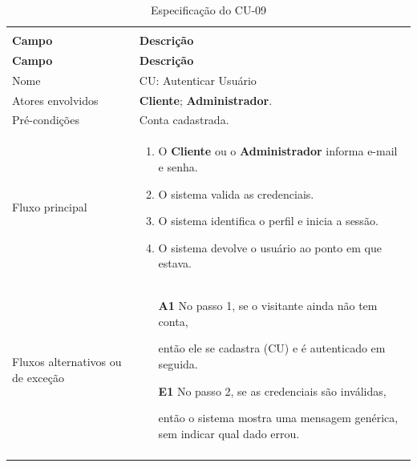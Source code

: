 \documentclass[12pt,a4paper]{article}
\begin{document}
{\setlength{\arrayrulewidth}{0.3pt}\renewcommand{\arraystretch}{1.1}\small{}
\begin{xltabular}{\textwidth}{>{\raggedright\arraybackslash}p{3.4cm}|>{\raggedright\arraybackslash}X}
\caption{Especificação do CU-09}\\
\toprule{}
\textbf{Campo} & \textbf{Descrição}\\ \midrule{}
\endfirsthead
{}\toprule{}
\textbf{Campo} & \textbf{Descrição}\\ \midrule{}
\endhead
\endlastfoot
Nome & CU: Autenticar Usuário\\ \hline
Atores envolvidos & \textbf{Cliente}; \textbf{Administrador}.\\ \hline
Pré-condições & Conta cadastrada.\\ \hline
Fluxo principal & \begin{enumerate}[nosep,leftmargin=1.4em,label=\arabic*.,before=\vspace{-\baselineskip},after=\vspace{-0.4\baselineskip}]\item O \textbf{Cliente} ou o \textbf{Administrador} informa e-mail e senha. \item O sistema valida as credenciais. \item O sistema identifica o perfil e inicia a sessão. \item O sistema devolve o usuário ao ponto em que estava. \end{enumerate}\\ \hline
Fluxos alternativos ou de exceção & \begin{itemize}[nosep,leftmargin=2.2em,labelwidth=2.2em,labelsep=0pt,align=left,itemsep=4pt,before=\vspace{-\baselineskip},after=\vspace{-0.4\baselineskip}]\item[\textbf{A1}] No passo 1, se o visitante ainda não tem conta,\par então ele se cadastra (CU) e é autenticado em seguida. \item[\textbf{E1}] No passo 2, se as credenciais são inválidas,\par então o sistema mostra uma mensagem genérica, sem indicar qual dado errou.\end{itemize}\\ \bottomrule
\end{xltabular}}
\end{document}

